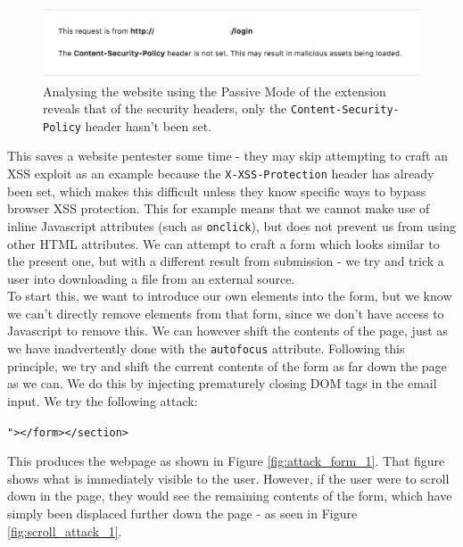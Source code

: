\begin{figure}[h!]
	\centering
	\includegraphics[width=\linewidth]{images/test_case_1/passive_analysis.png}
	\caption{Analysing the website using the Passive Mode of the extension reveals that of the security headers, only the \texttt{Content-Security-Policy} header hasn't been set. }
	\label{fig:passive_analysis}	
\end{figure} 

This saves a website pentester some time - they may skip attempting to craft an XSS exploit as an example because the \texttt{X-XSS-Protection} header has already been set, which makes this difficult unless they know specific ways to bypass browser XSS protection. This for example means that we cannot make use of inline Javascript attributes (such as \texttt{onclick}), but does not prevent us from using other HTML attributes. We can attempt to craft a form which looks similar to the present one, but with a different result from submission - we try and trick a user into downloading a file from an external source. \\

To start this, we want to introduce our own elements into the form, but we know we can't directly remove elements from that form, since we don't have access to Javascript to remove this. We can however shift the contents of the page, just as we have inadvertently done with the \texttt{autofocus} attribute. Following this principle, we try and shift the current contents of the form as far down the page as we can. We do this by injecting prematurely closing DOM tags in the email input. We try the following attack:

\begin{center}
	\texttt{"></form></section>}
\end{center}

This produces the webpage as shown in Figure \ref{fig:attack_form_1}. That figure shows what is immediately visible to the user. However, if the user were to scroll down in the page, they would see the remaining contents of the form, which have simply been displaced further down the page - as seen in Figure \ref{fig:scroll_attack_1}.

